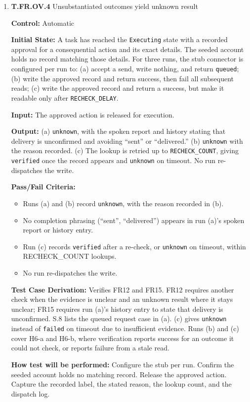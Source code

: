 \documentclass[12pt, titlepage]{article}
\begin{document}
\begin{enumerate}
\item{\textbf{T.FR.OV.4} Unsubstantiated outcomes yield unknown result\\}\label{test:T.FR.OV.4}

\textbf{Control:} Automatic

\textbf{Initial State:} A task has reached the \texttt{Executing} state with a recorded approval for a consequential action and its exact details.
The seeded account holds no record matching those details. For three runs, the stub connector is configured per run to: 
(a) accept a send, write nothing, and return \texttt{queued}; (b) write the approved record and return success, then fail all subsequent reads;
(c) write the approved record and return a success, but make it readable only after \texttt{RECHECK\_DELAY}.

\textbf{Input:} The approved action is released for execution.

\textbf{Output:} (a) \texttt{unknown}, with the spoken report and history stating that delivery is unconfirmed and avoiding ``sent'' or ``delivered.''
(b) \texttt{unknown} with the reason recorded. (c) The lookup is retried up to \texttt{RECHECK\_COUNT}, giving \texttt{verified} once the record appears and
\texttt{unknown} on timeout. No run re-dispatches the write.

\textbf{Pass/Fail Criteria:}
\begin{itemize}
  \item Runs (a) and (b) record \texttt{unknown}, with the reason recorded in (b).
  \item No completion phrasing (``sent'', ``delivered'') appears in run (a)'s spoken report or history entry.
  \item Run (c) records \texttt{verified} after a re-check, or \texttt{unknown} on timeout, within RECHECK\_COUNT lookups.
  \item No run re-dispatches the write.
\end{itemize}

\textbf{Test Case Derivation:} Verifies FR12 and FR15. FR12 requires another check when the evidence is unclear and an unknown result where it stays unclear; FR15 requires run (a)'s history entry to state that delivery is unconfirmed. S.8 lists the queued request case in (a).
(c) gives \texttt{unknown} instead of \texttt{failed} on timeout due to insufficient evidence. Runs (b) and (c)
cover H6-a and H6-b, where verification reports success for an outcome it could not check, or reports failure
from a stale read.

\textbf{How test will be performed:} Configure the stub per run. Confirm the seeded account holds no matching record. Release the approved action. Capture the recorded label, the stated reason,
the lookup count, and the dispatch log.

\end{enumerate}
\end{document}
